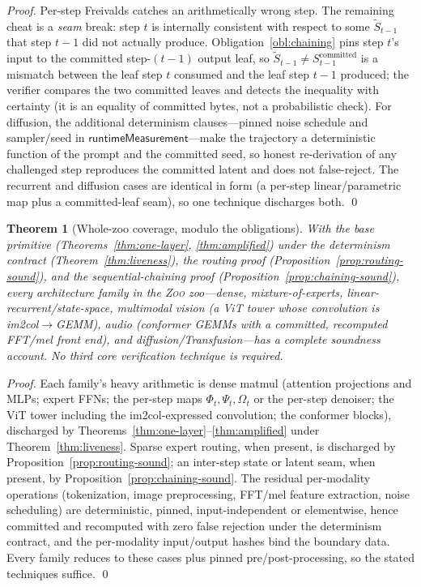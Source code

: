\documentclass[11pt]{article}
\newtheorem{theorem}{Theorem}
\newcommand{\Zoo}{\textsc{Zoo}}
\newcommand{\runtime}{\mathsf{runtimeMeasurement}}
\begin{document}
\begin{proof}
Per-step Freivalds catches an arithmetically wrong step. The remaining cheat is a \emph{seam}
break: step $t$ is internally consistent with respect to some $\tilde S_{t-1}$ that step
$t-1$ did not actually produce. Obligation~\ref{obl:chaining} pins step $t$'s input to the
committed step-$(t-1)$ output leaf, so $\tilde S_{t-1} \ne S_{t-1}^{\text{committed}}$ is a
mismatch between the leaf step $t$ consumed and the leaf step $t-1$ produced; the verifier
compares the two committed leaves and detects the inequality with certainty (it is an equality
of committed bytes, not a probabilistic check). For diffusion, the additional determinism
clauses---pinned noise schedule and sampler/seed in $\runtime$---make the trajectory a
deterministic function of the prompt and the committed seed, so honest re-derivation of any
challenged step reproduces the committed latent and does not false-reject. The recurrent and
diffusion cases are identical in form (a per-step linear/parametric map plus a committed-leaf
seam), so one technique discharges both. \qed
\end{proof}

\begin{theorem}[Whole-zoo coverage, modulo the obligations]
\label{thm:coverage}
With the base primitive (Theorems~\ref{thm:one-layer}, \ref{thm:amplified}) under the
determinism contract (Theorem~\ref{thm:liveness}), the routing proof
(Proposition~\ref{prop:routing-sound}), and the sequential-chaining proof
(Proposition~\ref{prop:chaining-sound}), every architecture family in the \Zoo{} zoo---dense,
mixture-of-experts, linear-recurrent/state-space, multimodal vision (a ViT tower whose
convolution is im2col$\to$GEMM), audio (conformer GEMMs with a committed, recomputed FFT/mel
front end), and diffusion/Transfusion---has a complete soundness account. No third core
verification technique is required.
\end{theorem}

\begin{proof}
Each family's heavy arithmetic is dense matmul (attention projections and MLPs; expert FFNs;
the per-step maps $\Phi_t,\Psi_t,\Omega_t$ or the per-step denoiser; the ViT tower including
the im2col-expressed convolution; the conformer blocks), discharged by
Theorems~\ref{thm:one-layer}--\ref{thm:amplified} under Theorem~\ref{thm:liveness}. Sparse
expert routing, when present, is discharged by Proposition~\ref{prop:routing-sound}; an
inter-step state or latent seam, when present, by Proposition~\ref{prop:chaining-sound}. The
residual per-modality operations (tokenization, image preprocessing, FFT/mel feature
extraction, noise scheduling) are deterministic, pinned, input-independent or elementwise,
hence committed and recomputed with zero false rejection under the determinism contract, and
the per-modality input/output hashes bind the boundary data. Every family reduces to these
cases plus pinned pre/post-processing, so the stated techniques suffice. \qed
\end{proof}
\end{document}
